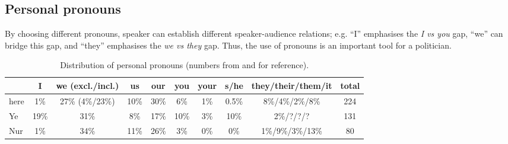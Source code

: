 \documentclass[11pt]{article}
\begin{document}
{	\subsection{Personal pronouns}{
		By choosing different pronouns, speaker can establish different speaker-audience relations; e.g. ``I'' emphasises the \textit{I vs you} gap, ``we'' can bridge this gap, and ``they'' emphasises the \textit{we vs they} gap. Thus, the use of pronouns is an important tool for a politician.

		\begin{table}[h!tb]
	      \centering
	        \begin{tabular}{l|ccccccccc}
	                & I    & we (excl./incl.) & us   & our  & you  & your & s/he  & they/their/them/it & total \\
	          \hline
	          \hline
	          here  & 1\%  & 27\% (4\%/23\%)  & 10\% & 30\% & 6\%  & 1\%  & 0.5\% & 8\%/4\%/2\%/8\%    & 224 \\
	          \hline
	          Ye    & 19\% & 31\%             & 8\%  & 17\% & 10\% & 3\%  & 10\%  & 2\%/?/?/?          & 131 \\
	          Nur   & 1\%  & 34\%             & 11\% & 26\% & 3\%  & 0\%  & 0\%   & 1\%/9\%/3\%/13\%   & 80 \\
	        \end{tabular}
	      \caption{Distribution of personal pronouns (numbers from \citeauthor{Ye} and \citeauthor{Nur} for reference).}
	      \label{tab:pronouns}
	    \end{table}

}}
\end{document}
